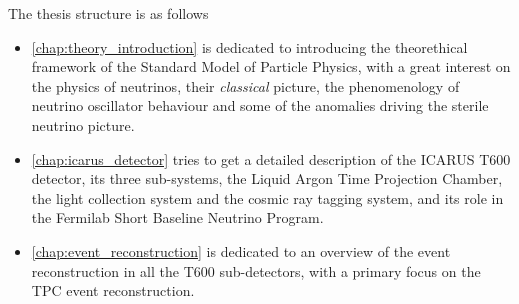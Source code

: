 

The thesis structure is as follows\begin{itemize}
    \item \autoref{chap:theory_introduction} is dedicated to introducing the theorethical framework of the Standard Model of Particle Physics, with a great interest on the physics of neutrinos, their \emph{classical} picture, the phenomenology of neutrino oscillator behaviour and some of the anomalies driving the sterile neutrino picture. 
    \item \autoref{chap:icarus_detector} tries to get a detailed description of the ICARUS T600 detector, its three sub-systems, the Liquid Argon Time Projection Chamber, the light collection system and the cosmic ray tagging system, and its role in the Fermilab Short Baseline Neutrino Program. 
    \item \autoref{chap:event_reconstruction} is dedicated to an overview of the event reconstruction in all the T600 sub-detectors, with a primary focus on the TPC event reconstruction. 
\end{itemize}

